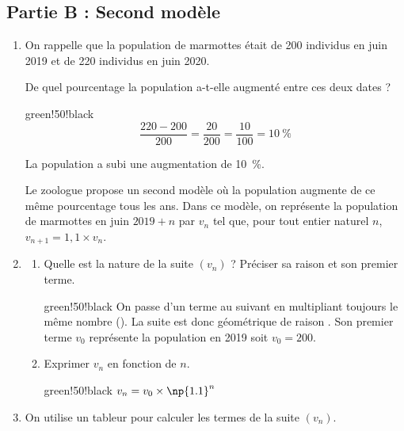 	\subsection*{Partie B : Second modèle}
	
	\begin{enumerate}
		\item On rappelle que la population de marmottes était de 200 individus en juin 2019 et de 220 individus en juin 2020.
		
		De quel pourcentage la population a-t-elle augmenté entre ces deux dates ?
		
		\begin{color}{green!50!black}
		\[
		\dfrac{220 - 200}{200} = \dfrac{20}{200} = \dfrac{10}{100} = 10~\%
		\]
		
		La population a subi une augmentation de 10~\%.
		\end{color}
		
		\medskip
		
		Le zoologue propose un second modèle où la population augmente de ce même pourcentage tous les ans. Dans ce modèle, on représente la population de marmottes en juin $2019+n$ par $v_{n}$ tel que, pour tout entier naturel $n$,\quad $v_{n+1}=1,1\times v_{n}$.
		
		\item \begin{enumerate}
			\item Quelle est la nature de la suite $\left(v_{n}\right)$ ? Préciser sa raison et son premier terme.
			
			\begin{color}{green!50!black}
			On passe d'un terme au suivant en multipliant toujours le même nombre (). La suite est donc géométrique de raison . Son premier terme $v_{0}$ représente la population en 2019 soit $v_{0}=200$.
			\end{color}
			
			\item Exprimer $v_{n}$ en fonction de $n$.
			
			\begin{color}{green!50!black}
			$v_{n}=v_{0} \times \np{1.1}^{n}$
			\end{color}
			
		\end{enumerate}
		
		\item On utilise un tableur pour calculer les termes de la suite $\left(v_{n}\right)$.
		

\end{enumerate}

